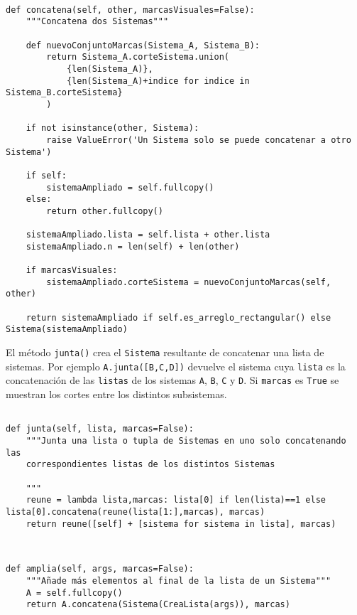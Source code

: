 \documentclass[11pt]{report}
\begin{document}
\begin{verbatim}

def concatena(self, other, marcasVisuales=False):
    """Concatena dos Sistemas"""
    
    def nuevoConjuntoMarcas(Sistema_A, Sistema_B):
        return Sistema_A.corteSistema.union(
            {len(Sistema_A)},
            {len(Sistema_A)+indice for indice in Sistema_B.corteSistema}
        )
    
    if not isinstance(other, Sistema):
        raise ValueError('Un Sistema solo se puede concatenar a otro Sistema')

    if self:
        sistemaAmpliado = self.fullcopy()
    else:
        return other.fullcopy()
        
    sistemaAmpliado.lista = self.lista + other.lista
    sistemaAmpliado.n = len(self) + len(other)
        
    if marcasVisuales: 
        sistemaAmpliado.corteSistema = nuevoConjuntoMarcas(self, other)

    return sistemaAmpliado if self.es_arreglo_rectangular() else Sistema(sistemaAmpliado)

\end{verbatim}

El método \texttt{junta()} crea el \texttt{Sistema} resultante de concatenar una
lista de sistemas. Por ejemplo \texttt{A.junta([B,C,D])} devuelve el sistema
cuya \texttt{lista} es la concatenación de las \texttt{listas} de los sistemas \texttt{A},
\texttt{B}, \texttt{C} y \texttt{D}. Si \texttt{marcas} es \texttt{True} se muestran los cortes entre los
distintos subsistemas.
\begin{verbatim}

def junta(self, lista, marcas=False):
    """Junta una lista o tupla de Sistemas en uno solo concatenando las
    correspondientes listas de los distintos Sistemas

    """
    reune = lambda lista,marcas: lista[0] if len(lista)==1 else lista[0].concatena(reune(lista[1:],marcas), marcas)    
    return reune([self] + [sistema for sistema in lista], marcas)
    
\end{verbatim}

\begin{verbatim}

def amplia(self, args, marcas=False):
    """Añade más elementos al final de la lista de un Sistema"""
    A = self.fullcopy()
    return A.concatena(Sistema(CreaLista(args)), marcas)

\end{verbatim}
\end{document}
